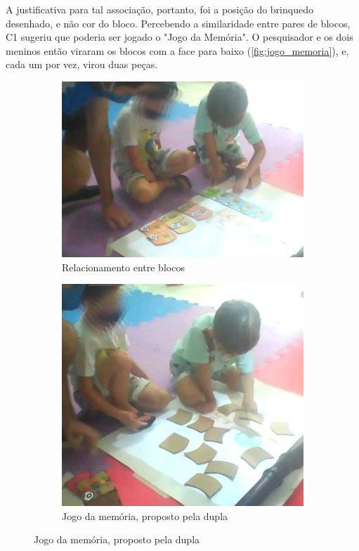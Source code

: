 A justificativa para tal associação, portanto, foi a posição do brinquedo desenhado, e não cor do bloco. Percebendo a similaridade entre pares de blocos, C1 sugeriu que poderia ser jogado o "Jogo da Memória". O pesquisador e os dois meninos então viraram os blocos com a face para baixo (\autoref{fig:jogo_memoria}), e, cada um por vez, virou duas peças.

\begin{figure}[!htbp]
    \begin{center}
    \begin{subfigure}{.5\textwidth}
        \centering
        \includegraphics[width=.9\linewidth,fbox]{figs/relacao_blocos.png}
        \caption{Relacionamento entre blocos}
        \label{fig:relacao_blocos}
    \end{subfigure}%
    \begin{subfigure}{.4\textwidth}
        \centering
        \includegraphics[width=.9\linewidth,fbox]{figs/jogo_memoria.png}
        \caption{Jogo da memória, proposto pela dupla}
        \label{fig:jogo_memoria}
    \end{subfigure}
    \end{center}
    \sourceauthor
    \label{fig:equipe1}
\end{figure}


